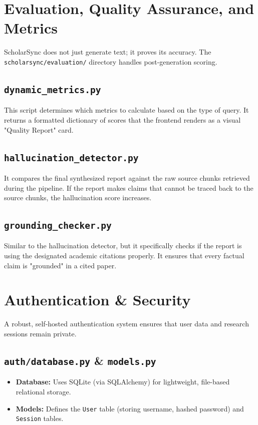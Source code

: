 \documentclass[12pt, a4paper]{report}
\begin{document}
\newpage

\chapter{Evaluation, Quality Assurance, and Metrics}

ScholarSync does not just generate text; it proves its accuracy. The \texttt{scholarsync/evaluation/} directory handles post-generation scoring.

\section{\texttt{dynamic\_metrics.py}}
This script determines which metrics to calculate based on the type of query. It returns a formatted dictionary of scores that the frontend renders as a visual "Quality Report" card.

\section{\texttt{hallucination\_detector.py}}
It compares the final synthesized report against the raw source chunks retrieved during the pipeline. If the report makes claims that cannot be traced back to the source chunks, the hallucination score increases.

\section{\texttt{grounding\_checker.py}}
Similar to the hallucination detector, but it specifically checks if the report is using the designated academic citations properly. It ensures that every factual claim is "grounded" in a cited paper.

\newpage

\chapter{Authentication \& Security}

A robust, self-hosted authentication system ensures that user data and research sessions remain private.

\section{\texttt{auth/database.py} \& \texttt{models.py}}
\begin{itemize}
    \item \textbf{Database:} Uses SQLite (via SQLAlchemy) for lightweight, file-based relational storage.
    \item \textbf{Models:} Defines the \texttt{User} table (storing username, hashed password) and \texttt{Session} tables.
\end{itemize}
\end{document}
